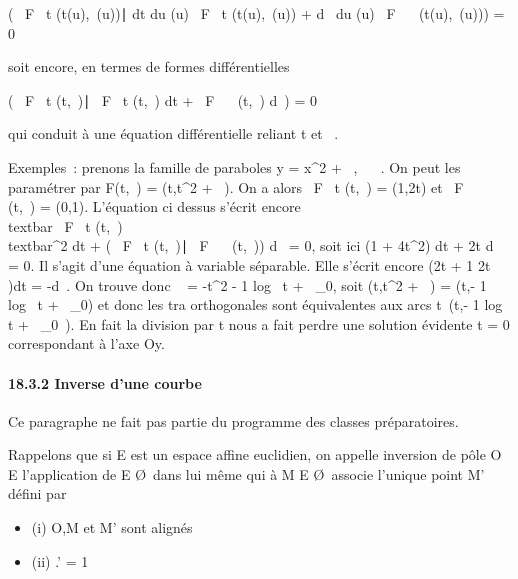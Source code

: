 \documentclass[]{article}
\begin{document}
\left ( \partial~F \over \partial~t
(t(u),\lambda~(u))∣ dt \over du
(u) \partial~F \over \partial~t (t(u),\lambda~(u)) + d\lambda~
\over du (u) \partial~F \over \partial~\lambda~
(t(u),\lambda~(u))\right ) = 0

soit encore, en termes de formes différentielles

\left ( \partial~F \over \partial~t
(t,\lambda~)∣ \partial~F \over \partial~t (t,\lambda~)
dt + \partial~F \over \partial~\lambda~ (t,\lambda~) d\lambda~\right ) = 0

qui conduit à une équation différentielle reliant t et \lambda~.

Exemples~: prenons la famille de paraboles y = x^2 + \lambda~, \lambda~ \in
{}~. On peut les paramétrer par F(t,\lambda~) = (t,t^2 + \lambda~). On a
alors  \partial~F \over \partial~t (t,\lambda~) = (1,2t) et  \partial~F
\over \partial~\lambda~ (t,\lambda~) = (0,1). L'équation ci dessus s'écrit
encore \\textbar{} \partial~F \over \partial~t
(t,\lambda~)\\textbar{}^2 dt + \left
( \partial~F \over \partial~t (t,\lambda~)∣ \partial~F
\over \partial~\lambda~ (t,\lambda~)\right ) d\lambda~ = 0, soit ici
(1 + 4t^2) dt + 2t d\lambda~ = 0. Il s'agit d'une équation à
variable séparable. Elle s'écrit encore (2t + 1 \over
2t )dt = -d\lambda~. On trouve donc \lambda~ = -t^2 - 1
  log~
\textbar{}t\textbar{} + \lambda~\_0, soit (t,t^2 + \lambda~) =
(t,- 1   log~
\textbar{}t\textbar{} + \lambda~\_0) et donc les tra\jmathectoires
orthogonales sont équivalentes aux arcs
t\mapsto~(t,- 1 
 log t + \lambda~\_0~). En fait la division
par t nous a fait perdre une solution évidente t = 0 correspondant à
l'axe Oy.

\paragraph{18.3.2 Inverse d'une courbe}

Ce paragraphe ne fait pas partie du programme des classes préparatoires.

Rappelons que si E est un espace affine euclidien, on appelle inversion
de pôle O \in E l'application de E \diagdown\O\
dans lui même qui à M \in E \diagdown\O\ associe
l'unique point M' défini par

\begin{itemize}
\itemsep1pt\parskip0pt
\item
  (i) O,M et M' sont alignés
\item
  (ii) \overlineOM.\overlineOM' =
  1
\end{itemize}
\end{document}
